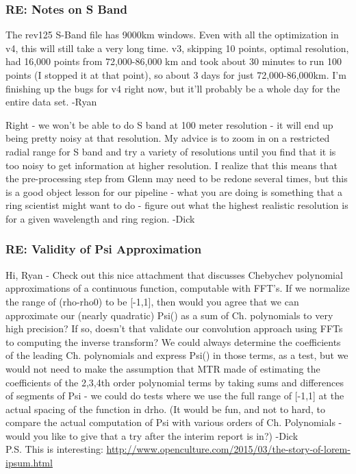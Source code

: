 \documentclass[crop=false,class=book]{standalone}
\begin{document}
\subsubsection{\footnotesize RE: Notes on S Band}
The rev125 S-Band file has 9000km windows. Even with all the optimization in v4, this will still take a very long time. v3, skipping 10 points, optimal resolution, had 16,000 points from 72,000-86,000 km and took about 30 minutes to run 100 points (I stopped it at that point), so about 3 days for just 72,000-86,000km. I'm finishing up the bugs for v4 right now, but it'll probably be a whole day for the entire data set. -Ryan\par
Right - we won't be able to do S band at 100 meter resolution - it will end up being pretty noisy at that resolution. My advice is to zoom in on a restricted radial range for S band and try a variety of resolutions until you find that it is too noisy to get information at higher resolution. I realize that this means that the pre-processing step from Glenn may need to be redone several times, but this is a good object lesson for our pipeline - what you are doing is something that a ring scientist might want to do - figure out what the highest realistic resolution is for a given wavelength and ring region. -Dick
\subsubsection{\footnotesize RE: Validity of Psi Approximation}
Hi, Ryan - Check out this nice attachment that discusses Chebychev polynomial approximations of a continuous function, computable with FFT's. If we normalize the range of (rho-rho0) to be [-1,1], then would you agree that we can approximate our (nearly quadratic) Psi() as a sum of Ch. polynomials to very high precision? If so, doesn't that validate our convolution approach using FFTs to computing the inverse transform? We could always determine the coefficients of the leading Ch. polynomials and express Psi() in those terms, as a test, but we would not need to make the assumption that MTR made of estimating the coefficients of the 2,3,4th order polynomial terms by taking sums and differences of segments of Psi - we could do tests where we use the full range of [-1,1] at the actual spacing of the function in drho.
(It would be fun, and not to hard, to compare the actual computation of Psi with various orders of Ch. Polynomials - would you like to give that a try after the interim report is in?) -Dick\\
P.S. This is interesting: \url{http://www.openculture.com/2015/03/the-story-of-lorem-ipsum.html}
\end{document}
